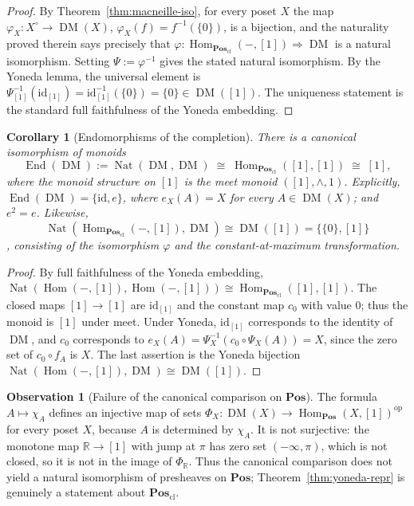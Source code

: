 \documentclass{amsart}
\theoremstyle{plain}
\newtheorem{corollary}{Corollary}[section]
\theoremstyle{definition}
\newtheorem{observation}[theorem]{Observation}
\theoremstyle{remark}
\DeclareMathOperator{\DM}{DM}
\DeclareMathOperator{\Hom}{Hom}
\DeclareMathOperator{\End}{End}
\DeclareMathOperator{\Nat}{Nat}
\begin{document}
\begin{proof}
By Theorem~\ref{thm:macneille-iso}, for every poset $X$ the map $\varphi_X\colon X^\circ\to\DM(X)$, $\varphi_X(f)=f^{-1}(\{0\})$, is a bijection, and the naturality proved therein says precisely that $\varphi\colon\Hom_{\mathbf{Pos}_{\mathrm{cl}}}(-,[1])\Rightarrow\DM$ is a natural isomorphism. Setting $\Psi:=\varphi^{-1}$ gives the stated natural isomorphism. By the Yoneda lemma, the universal element is $\Psi_{[1]}^{-1}(\mathrm{id}_{[1]})=\mathrm{id}_{[1]}^{-1}(\{0\})=\{0\}\in\DM([1])$. The uniqueness statement is the standard full faithfulness of the Yoneda embedding.
\end{proof}

\begin{corollary}[Endomorphisms of the completion]\label{cor:end-DM}
There is a canonical isomorphism of monoids
\[
\End(\DM):=\Nat(\DM,\DM)\;\cong\;
\Hom_{\mathbf{Pos}_{\mathrm{cl}}}([1],[1])\;\cong\;[1],
\]
where the monoid structure on $[1]$ is the meet monoid $([1],\wedge,1)$. Explicitly, $\End(\DM)=\{\mathrm{id},e\}$, where $e_X(A)=X$ for every $A\in\DM(X)$; and $e^2=e$. Likewise, 
\[
\Nat(\Hom_{\mathbf{Pos}_{\mathrm{cl}}}(-,[1]),\DM)\cong\DM([1])=\{\{0\},[1]\}
\]
, consisting of the isomorphism $\varphi$ and the constant-at-maximum transformation.
\end{corollary}

\begin{proof}
By full faithfulness of the Yoneda embedding, $\Nat(\Hom(-,[1]),\Hom(-,[1]))\cong\Hom_{\mathbf{Pos}_{\mathrm{cl}}}([1],[1])$. The closed maps $[1]\to[1]$ are $\mathrm{id}_{[1]}$ and the constant map $c_0$ with value $0$; thus the monoid is $[1]$ under meet. Under Yoneda, $\mathrm{id}_{[1]}$ corresponds to the identity of $\DM$, and $c_0$ corresponds to $e_X(A)=\Psi_X^{-1}(c_0\circ\Psi_X(A))=X$, since the zero set of $c_0\circ f_A$ is $X$. The last assertion is the Yoneda bijection $\Nat(\Hom(-,[1]),\DM)\cong\DM([1])$.
\end{proof}

\begin{observation}[Failure of the canonical comparison on $\mathbf{Pos}$]\label{obs:not-repr-pos}
The formula $A\mapsto\chi_A$ defines an injective map of sets $\Phi_X\colon\DM(X)\to\Hom_{\mathbf{Pos}}(X,[1])^{\mathrm{op}}$ for every poset $X$, because $A$ is determined by $\chi_A$. It is not surjective: the monotone map $\mathbb{R}\to[1]$ with jump at $\pi$ has zero set $(-\infty,\pi)$, which is not closed, so it is not in the image of $\Phi_{\mathbb{R}}$. Thus the canonical comparison does not yield a natural isomorphism of presheaves on $\mathbf{Pos}$; Theorem~\ref{thm:yoneda-repr} is genuinely a statement about $\mathbf{Pos}_{\mathrm{cl}}$.
\end{observation}
\end{document}
